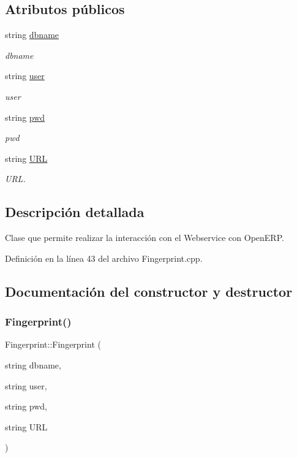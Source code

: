 \subsection*{Atributos públicos}
\begin{DoxyCompactItemize}
\item 
string \hyperlink{classFingerprint_a673ea9e701f981e8d47873da6c018959}{dbname}
\begin{DoxyCompactList}\small\item\em dbname \end{DoxyCompactList}\item 
string \hyperlink{classFingerprint_a23d9e08e3e34d64fcf0771a1c2590a4e}{user}
\begin{DoxyCompactList}\small\item\em user \end{DoxyCompactList}\item 
string \hyperlink{classFingerprint_a1e4d2c44581328219f378933b30c9828}{pwd}
\begin{DoxyCompactList}\small\item\em pwd \end{DoxyCompactList}\item 
string \hyperlink{classFingerprint_a3e3626c36b44fa9d7d522196e2d121ff}{U\+RL}
\begin{DoxyCompactList}\small\item\em U\+RL. \end{DoxyCompactList}\end{DoxyCompactItemize}


\subsection{Descripción detallada}
Clase que permite realizar la interacción con el Webservice con Open\+E\+RP. 

Definición en la línea 43 del archivo Fingerprint.\+cpp.



\subsection{Documentación del constructor y destructor}
\hypertarget{classFingerprint_a49a71ef02669dc397c509304fa465714}{}\label{classFingerprint_a49a71ef02669dc397c509304fa465714} 
\subsubsection{\texorpdfstring{Fingerprint()}{Fingerprint()}}
{\footnotesize\ttfamily Fingerprint\+::\+Fingerprint (\begin{DoxyParamCaption}\item[{string}]{dbname,  }\item[{string}]{user,  }\item[{string}]{pwd,  }\item[{string}]{U\+RL }\end{DoxyParamCaption})\hspace{0.3cm}{\ttfamily [inline]}}



